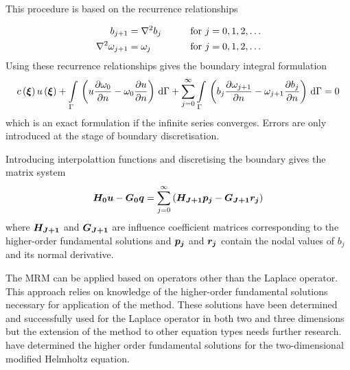 This procedure is based on the recurrence relationships

\begin{alignat}{2}
  b_{j+1} & = \laplacian{}{b_{j}} & \qquad \text{for }j &= 0,1,2,\ldots
  \label{eq:recurr} \\
  \laplacian{}{\omega_{j+1}} & = \omega_{j} & \qquad \text{for }j &= 0,1,2,\ldots
  \label{eq:higher}
\end{alignat}
Using these recurrence relationships gives the boundary integral formulation
\begin{equation}
  \fnof{c}{\vect{\xi}} \fnof{u}{\vect{\xi}} + 
  \goneint{\pbrac{u\delby{\omega_{0}}{n} - \omega_{0} \delby{u}{n}}}{\Gamma} +
  \dsuml{j=0}{\infty}   \goneint{\pbrac{b_{j}\delby{\omega_{j+1}}{n} 
      - \omega_{j+1} \delby{b_{j}}{n}}}{\Gamma} = 0
\end{equation}
which is an exact formulation if the infinite series converges.  Errors are
only introduced at the stage of boundary discretisation.  

Introducing interpolattion functions and discretising the boundary gives
the matrix system
\begin{equation}
  \matr{H_{0}} \vect{u} - \matr{G_{0}} \vect{q} = \dsuml{j=0}{\infty}
  \pbrac{\matr{H_{j+1}} \vect{P_{j}} - \matr{G_{j+1}} \vect{R_{j}}}
\end{equation}
where $\matr{H_{j+1}}$ and $\matr{G_{j+1}}$ are influence coefficient
matrices corresponding to the higher-order fundamental solutions and
$\vect{p_{j}}$ and $\vect{r_{j}}$ contain the nodal values of $b_{j}$ and its
normal derivative. 

The MRM can be applied based on operators other than the Laplace operator.
This approach relies on knowledge of the higher-order fundamental solutions
necessary for application of the method.  These solutions have been
determined and successfully used for the Laplace operator in both two and
three dimensions but the extension of the method to other equation types
needs further research.  \citet{itagaki:1993} have determined the higher
order fundamental solutions for the two-dimensional modified Helmholtz
equation.

